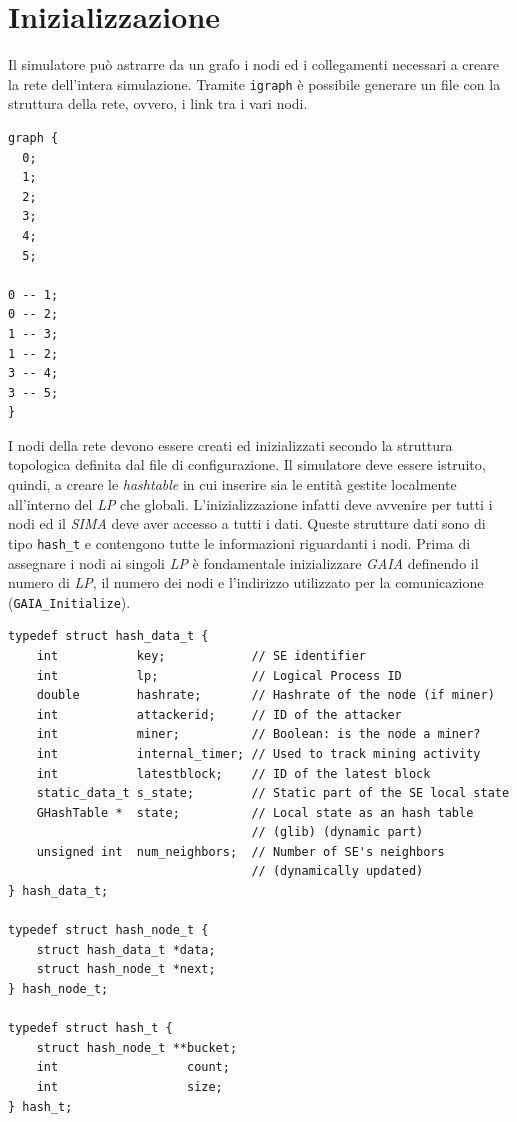 \section{Inizializzazione}
Il simulatore può astrarre da un grafo i nodi ed i collegamenti necessari a creare la rete dell'intera simulazione. Tramite \texttt{igraph} è possibile generare un file con la struttura della rete, ovvero, i link tra i vari nodi.
\begin{lstlisting}[frame=none,caption=Esempio di un file generato da \texttt{igraph} con $6$ nodi.]
graph {
  0;
  1;
  2;
  3;
  4;
  5;

0 -- 1;
0 -- 2;
1 -- 3;
1 -- 2;
3 -- 4;
3 -- 5;
}
\end{lstlisting}
I nodi della rete devono essere creati ed inizializzati secondo la struttura topologica definita dal file di configurazione.
Il simulatore deve essere istruito, quindi, a creare le \textit{hashtable} in cui inserire sia le entità gestite localmente all'interno del \textit{LP} che globali. L'inizializzazione infatti deve avvenire per tutti i nodi ed il \textit{SIMA} deve aver accesso a tutti i dati. Queste strutture dati sono di tipo \texttt{hash\_t} e contengono tutte le informazioni riguardanti i nodi.\newline
Prima di assegnare i nodi ai singoli \textit{LP} è fondamentale inizializzare \textit{GAIA} definendo il numero di \textit{LP}, il numero dei nodi e l'indirizzo utilizzato per la comunicazione (\texttt{GAIA\_Initialize}).
\begin{code}
\begin{verbatim}
typedef struct hash_data_t {
    int           key;            // SE identifier
    int           lp;             // Logical Process ID
    double        hashrate;       // Hashrate of the node (if miner)
    int           attackerid;     // ID of the attacker
    int           miner;          // Boolean: is the node a miner?
    int           internal_timer; // Used to track mining activity
    int           latestblock;    // ID of the latest block
    static_data_t s_state;        // Static part of the SE local state
    GHashTable *  state;          // Local state as an hash table
                                  // (glib) (dynamic part)
    unsigned int  num_neighbors;  // Number of SE's neighbors
                                  // (dynamically updated)
} hash_data_t;

typedef struct hash_node_t {
    struct hash_data_t *data;
    struct hash_node_t *next;
} hash_node_t;

typedef struct hash_t {
    struct hash_node_t **bucket;
    int                  count;
    int                  size;
} hash_t;
\end{verbatim}
\end{code}
